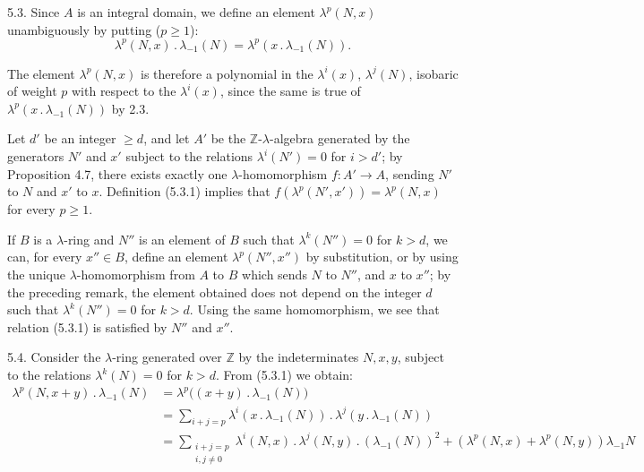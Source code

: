 5.3. Since \(A\) is an integral domain, we define an element \(\lambda^p(N,x)\) unambiguously by putting (\(p\ge1\)):
\begin{equation}\tag{5.3.1}
  \lambda^p(N,x)\mathbin{.}\lambda_{-1}(N)=\lambda^p(x\mathbin{.}\lambda_{-1}(N)).
\end{equation}

The element \(\lambda^p(N,x)\) is therefore a polynomial in the \(\lambda^i(x)\), \(\lambda^j(N)\), isobaric of weight \(p\) with respect to the \(\lambda^i(x)\), since the same is true of \(\lambda^p(x\mathbin{.}\lambda_{-1}(N))\) by 2.3.

Let \(d'\) be an integer \(\ge d\), and let \(A'\) be the \(\mathbb Z\)-\(\lambda\)-algebra generated by the generators \(N'\) and \(x'\) subject to the relations \(\lambda^i(N')=0\) for \(i>d'\); by Proposition 4.7, there exists exactly one \(\lambda\)-homomorphism \(f:A'\longrightarrow A\), sending \(N'\) to \(N\) and \(x'\) to \(x\). Definition (5.3.1) implies that \(f(\lambda^p(N',x'))=\lambda^p(N,x)\) for every \(p\ge1\).

If \(B\) is a \(\lambda\)-ring and \(N''\) is an element of \(B\) such that \(\lambda^k(N'')=0\) for \(k>d\), we can, for every \(x''\in B\), define an element \(\lambda^p(N'',x'')\) by substitution, or by using the unique \(\lambda\)-homomorphism from \(A\) to
%
\(B\) which sends \(N\) to \(N''\), and \(x\) to \(x''\); by the preceding remark, the element obtained does not depend on the integer \(d\) such that \(\lambda^k(N'')=0\) for \(k>d\). Using the same homomorphism, we see that relation (5.3.1) is satisfied by \(N''\) and \(x''\).

5.4. Consider the \(\lambda\)-ring generated over \(\mathbb Z\) by the indeterminates \(N,x,y\), subject to the relations \(\lambda^k(N)=0\) for \(k>d\). From (5.3.1) we obtain:
\begin{align*}
  \lambda^p(N,x+y)\mathbin{.}\lambda_{-1}(N)
  &=\lambda^p\bigl((x+y)\mathbin{.}\lambda_{-1}(N)\bigr)\\
  &=\sum_{i+j=p}\lambda^i(x\mathbin{.}\lambda_{-1}(N))\mathbin{.}\lambda^j(y\mathbin{.}\lambda_{-1}(N))\\
  &=\sum_{\substack{i+j=p\\ i,j\ne0}}\lambda^i(N,x)\mathbin{.}\lambda^j(N,y)\mathbin{.}(\lambda_{-1}(N))^2
    +(\lambda^p(N,x)+\lambda^p(N,y))\lambda_{-1}N
\end{align*}

